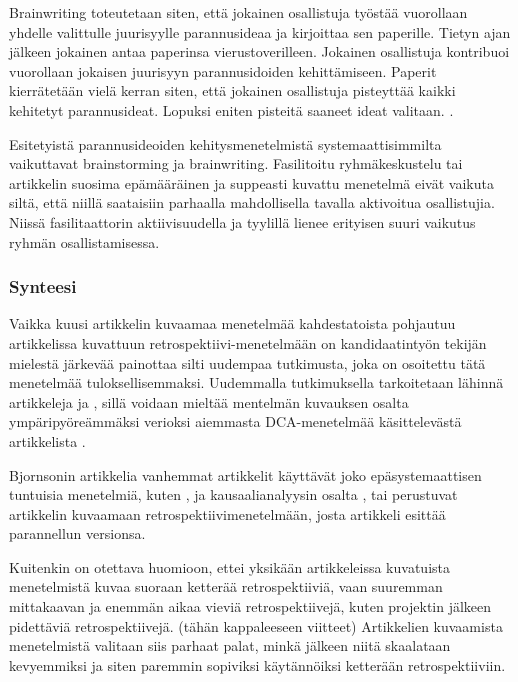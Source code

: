Brainwriting toteutetaan siten, että jokainen osallistuja työstää vuorollaan yhdelle valittulle juurisyylle parannusideaa ja kirjoittaa sen paperille. Tietyn ajan jälkeen jokainen antaa paperinsa vierustoverilleen. Jokainen osallistuja kontribuoi vuorollaan jokaisen juurisyyn parannusidoiden kehittämiseen. Paperit kierrätetään vielä kerran siten, että jokainen osallistuja pisteyttää kaikki kehitetyt parannusideat. Lopuksi eniten pisteitä saaneet ideat valitaan. \citep{Lehtinen2011}.

Esitetyistä parannusideoiden kehitysmenetelmistä systemaattisimmilta vaikuttavat brainstorming ja brainwriting. Fasilitoitu ryhmäkeskustelu tai artikkelin \citep{staalhane2003post} suosima epämääräinen ja suppeasti kuvattu menetelmä eivät vaikuta siltä, että niillä saataisiin parhaalla mahdollisella tavalla aktivoitua osallistujia. Niissä fasilitaattorin aktiivisuudella ja tyylillä lienee erityisen suuri vaikutus ryhmän osallistamisessa.

\subsubsection{Synteesi}
Vaikka kuusi artikkelin kuvaamaa menetelmää kahdestatoista pohjautuu artikkelissa \citep{birk2002postmortem} kuvattuun retrospektiivi-menetelmään on kandidaatintyön tekijän mielestä järkevää painottaa silti uudempaa tutkimusta, joka on osoitettu tätä menetelmää tuloksellisemmaksi. Uudemmalla tutkimuksella tarkoitetaan lähinnä artikkeleja \citep{Lehtinen2011} ja \citep{Bjornson2009}, sillä \citep{kalinowski2012evidence} voidaan mieltää mentelmän kuvauksen osalta ympäripyöreämmäksi verioksi aiemmasta DCA-menetelmää käsittelevästä artikkelista \citep{card1998learning}.

Bj{o}rnsonin artikkelia vanhemmat artikkelit käyttävät joko epäsystemaattisen tuntuisia menetelmiä, kuten \citep{karlsson2006case}, \citep{staalhane2003post} ja kausaalianalyysin osalta \citep{card1998learning}, tai perustuvat artikkelin \citep{birk2002postmortem} kuvaamaan retrospektiivimenetelmään, josta artikkeli \citep{Bjornson2009} esittää parannellun versionsa.

Kuitenkin on otettava huomioon, ettei yksikään artikkeleissa kuvatuista menetelmistä kuvaa suoraan ketterää retrospektiiviä, vaan suuremman mittakaavan ja enemmän aikaa vieviä retrospektiivejä, kuten projektin jälkeen pidettäviä retrospektiivejä. (tähän kappaleeseen viitteet) Artikkelien kuvaamista menetelmistä valitaan siis parhaat palat, minkä jälkeen niitä skaalataan kevyemmiksi ja siten paremmin sopiviksi käytännöiksi ketterään retrospektiiviin.

